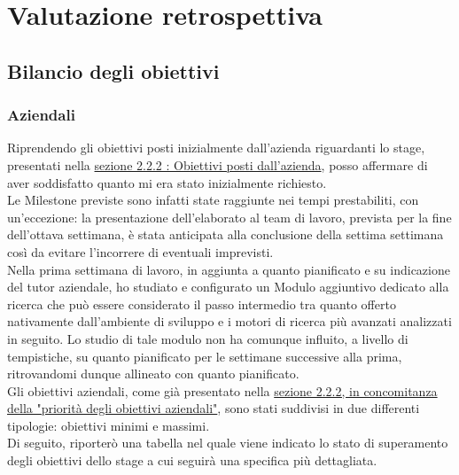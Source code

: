 

\chapter{Valutazione retrospettiva}
\label{valutazione_retrospettiva}

\section{Bilancio degli obiettivi}

	\subsection{Aziendali}
	
	Riprendendo gli obiettivi posti inizialmente dall'azienda riguardanti lo stage, presentati nella \hyperref[sub:obiettivi_posti_azienda]{sezione 2.2.2 : Obiettivi posti dall'azienda}, posso affermare di aver soddisfatto quanto mi era stato inizialmente richiesto. \\
	Le \gls{Milestone} previste sono infatti state raggiunte nei tempi prestabiliti, con un'eccezione: la presentazione dell'elaborato al team di lavoro, prevista per la fine dell'ottava settimana, è stata anticipata alla conclusione della settima settimana così da evitare l'incorrere di eventuali imprevisti. \\
	Nella prima settimana di lavoro, in aggiunta a quanto pianificato e su indicazione del tutor aziendale, ho studiato e configurato un \gls{Modulo} aggiuntivo dedicato alla ricerca che può essere considerato il passo intermedio tra quanto offerto nativamente dall'ambiente di sviluppo e i motori di ricerca più avanzati analizzati in seguito. Lo studio di tale modulo non ha comunque influito, a livello di tempistiche, su quanto pianificato per le settimane successive alla prima, ritrovandomi dunque allineato con quanto pianificato. \\
	Gli obiettivi aziendali, come già presentato nella \hyperref[subsub:priorita_degli_obiettivi_aziendali]{sezione 2.2.2, in concomitanza della "priorità degli obiettivi aziendali"}, sono stati suddivisi in due differenti tipologie: obiettivi minimi e massimi. \\
	Di seguito, riporterò una tabella nel quale viene indicato lo stato di superamento degli obiettivi dello stage a cui seguirà una specifica più dettagliata.


